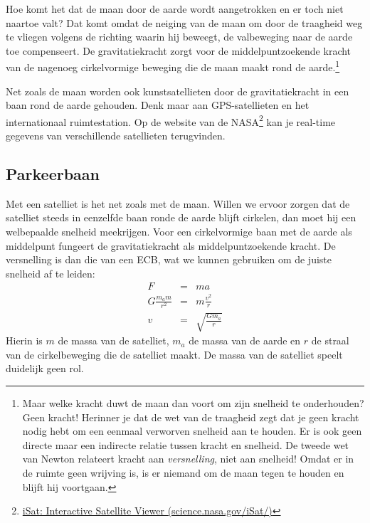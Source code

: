 \documentclass{ximera}
\begin{document}
	\author{Bart Lambregs}
    \xmsource\xmuitleg



	Hoe komt het dat de maan door de aarde wordt aangetrokken en er toch niet naartoe valt? Dat komt omdat de neiging van de maan om door de traagheid weg te vliegen volgens de richting waarin hij beweegt, de valbeweging naar de aarde toe compenseert. De gravitatiekracht zorgt voor de middelpuntzoekende kracht van de nagenoeg cirkelvormige beweging die de maan maakt rond de aarde.\footnote{Maar welke kracht duwt de maan dan voort om zijn snelheid te onderhouden? Geen kracht! Herinner je dat de wet van de traagheid zegt dat je geen kracht nodig hebt om een eenmaal verworven snelheid aan te houden. Er is ook geen directe maar een indirecte relatie tussen kracht en snelheid. De tweede wet van Newton relateert kracht aan \textit{versnelling}, niet aan snelheid! Omdat er in de ruimte geen wrijving is, is er niemand om de maan tegen te houden en blijft hij voortgaan.}
	
	Net zoals de maan worden ook kunstsatellieten door de gravitatiekracht in een baan rond de aarde gehouden. Denk maar aan GPS-satellieten en het internationaal ruimtestation. Op de website van de NASA\footnote{\href{http://science.nasa.gov/iSat/}{iSat: Interactive Satellite Viewer (science.nasa.gov/iSat/)}} kan je real-time gegevens van verschillende satellieten terugvinden.

	
	\subsection{Parkeerbaan}
	
	Met een satelliet is het net zoals met de maan. Willen we ervoor zorgen dat de satelliet steeds in eenzelfde baan ronde de aarde blijft cirkelen, dan moet hij een welbepaalde snelheid meekrijgen. Voor een cirkelvormige baan met de aarde als middelpunt fungeert de gravitatiekracht als middelpuntzoekende kracht. De versnelling is dan die van een ECB, wat we kunnen gebruiken om de juiste snelheid af te leiden:
	\begin{eqnarray*}
	F&=&ma\\
	G\frac{m_am}{r^2}&=&m\frac{v^2}{r}\\
	v&=&\sqrt{\frac{Gm_a}{r}}
	\end{eqnarray*}
	Hierin is $m$ de massa van de satelliet, $m_a$ de massa van de aarde en $r$ de straal van de cirkelbeweging die de satelliet maakt. De massa van de satelliet speelt duidelijk geen rol. 
	
\end{document}
